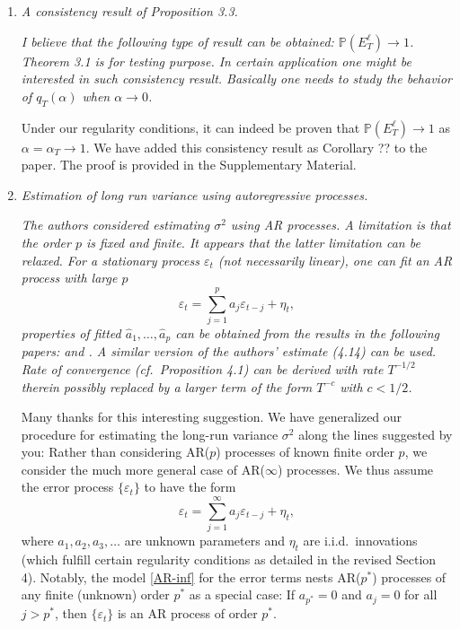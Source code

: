 \documentclass[a4paper,12pt]{article}
\begin{document}
\begin{enumerate}[label=(\arabic*),leftmargin=0.8cm]

\item \textit{A consistency result of Proposition 3.3.}

\textit{I believe that the following type of result can be obtained: $\mathbb{P} (E^{\ell}_T) \to 1$. Theorem 3.1 is for testing purpose. In certain application one might be interested in such consistency result. Basically one needs to study the behavior of $q_T(\alpha)$ when $\alpha \to 0$.}

Under our regularity conditions, it can indeed be proven that $\mathbb{P} (E^{\ell}_T) \to 1$ as $\alpha=\alpha_T \rightarrow 1$. We have added this consistency result as Corollary ?? to the paper. The proof is provided in the Supplementary Material.


\item \textit{Estimation of long run variance using autoregressive processes.}

\textit{The authors considered estimating $\sigma^2$ using AR processes. A limitation is that the order $p$ is fixed and finite. It appears that the latter limitation can be relaxed. For a stationary process $\varepsilon_t$ (not necessarily linear), one can fit an AR process with large $p$}
\[ \varepsilon_t = \sum_{j=1}^p a_j \varepsilon_{t-j} + \eta_t, \]
\textit{properties of fitted $\widehat{a}_1, \ldots, \widehat{a}_p$ can be obtained from the results in the following papers: \cite{WuPourahmadi2009} and \cite{XiaoWu2012}.
A similar version of the authors' estimate (4.14) can be used. Rate of convergence (cf.\ Proposition 4.1) can be derived with rate $T^{-1/2}$ therein possibly replaced by a larger term of the form $T^{-c}$ with $c < 1/2$.}

Many thanks for this interesting suggestion. We have generalized our procedure for estimating the long-run variance $\sigma^2$ along the lines suggested by you: Rather than considering AR($p$) processes of known finite order $p$, we consider the much more general case of AR($\infty$) processes. We thus assume the error process $\{\varepsilon_t\}$ to have the form
\begin{equation}\label{AR-inf}
\varepsilon_t = \sum\limits_{j=1}^\infty a_j \varepsilon_{t-j} + \eta_t, \tag{$*$} 
\end{equation}
where $a_1,a_2,a_3,\ldots$ are unknown parameters and $\eta_t$ are i.i.d.\ innovations (which fulfill certain regularity conditions as detailed in the revised Section 4). Notably, the model \eqref{AR-inf} for the error terms nests AR($p^*$) processes of any finite (unknown) order $p^*$ as a special case: If $a_{p^*} = 0$ and $a_j = 0$ for all $j > p^*$, then $\{ \varepsilon_t \}$ is an AR process of order $p^*$. 


\end{enumerate}
\end{document}
